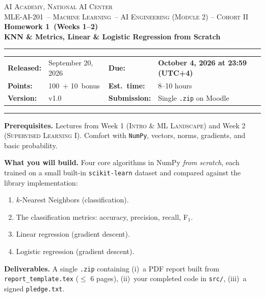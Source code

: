 \documentclass[11pt,a4paper]{article}
\newcommand{\coursecode}{MLE-AI-201}
\newcommand{\coursename}{Machine Learning}
\newcommand{\institution}{AI Academy, National AI Center}
\newcommand{\cohort}{Cohort II}
\newcommand{\hwnumber}{1}
\newcommand{\hwtitle}{KNN \& Metrics, Linear \& Logistic Regression from Scratch}
\newcommand{\releasedate}{September 20, 2026}
\newcommand{\duedate}{October 4, 2026 at 23:59 (UTC+4)}
\newcommand{\totalpoints}{100}
\newcommand{\bonuspoints}{10}
\newcommand{\estimatedtime}{8--10 hours}
\newcommand{\version}{v1.0}
\begin{document}
\begin{center}
{\small \textsc{\institution} \\[0.2em] \textsc{\coursecode\ -- \coursename\ -- AI Engineering (Module 2) -- \cohort}}\\[1.2em]
{\Large\bfseries\color{accent} Homework \hwnumber\ (Weeks 1--2)}\\[0.3em]
{\LARGE\bfseries \hwtitle}\\[1em]
\rule{0.85\textwidth}{0.6pt}
\end{center}

\begin{tabularx}{\textwidth}{@{}lXlX@{}}
\textbf{Released:} & \releasedate & \textbf{Due:} & \textcolor{accent2}{\textbf{\duedate}} \\
\textbf{Points:} & \totalpoints\ + \bonuspoints\ bonus & \textbf{Est.\ time:} & \estimatedtime \\
\textbf{Version:} & \version & \textbf{Submission:} & Single \texttt{.zip} on Moodle \\
\end{tabularx}

\vspace{0.4em}\hrule\vspace{0.6em}

\begin{infobox}[At a glance]
\textbf{Prerequisites.} Lectures from Week 1 (\textsc{Intro \& ML Landscape}) and Week 2 (\textsc{Supervised Learning I}). Comfort with \texttt{NumPy}, vectors, norms, gradients, and basic probability.

\smallskip\textbf{What you will build.} Four core algorithms in NumPy \emph{from scratch}, each trained on a small built-in \texttt{scikit-learn} dataset and compared against the library implementation:
\begin{enumerate}[label=\textbf{\arabic*.}, leftmargin=2.2em, topsep=2pt, itemsep=1pt]
  \item $k$-Nearest Neighbors (classification).
  \item The classification metrics: accuracy, precision, recall, F$_1$.
  \item Linear regression (gradient descent).
  \item Logistic regression (gradient descent).
\end{enumerate}

\smallskip\textbf{Deliverables.} A single \texttt{.zip} containing (i)~a PDF report built from \texttt{report\_template.tex} ($\le$ 6 pages), (ii)~your completed code in \texttt{src/}, (iii)~a signed \texttt{pledge.txt}.
\end{infobox}
\end{document}
